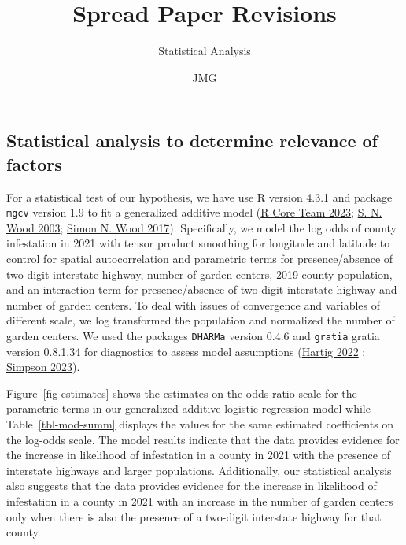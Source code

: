\documentclass[
  letterpaper,
  DIV=11,
  numbers=noendperiod]{scrartcl}
\title{Spread Paper Revisions}
\subtitle{Statistical Analysis}
\author{JMG}
\date{}
\begin{document}
\maketitle
\ifdefined\Shaded\renewenvironment{Shaded}{\begin{tcolorbox}[sharp corners, interior hidden, borderline west={3pt}{0pt}{shadecolor}, enhanced, boxrule=0pt, frame hidden, breakable]}{\end{tcolorbox}}\fi

\hypertarget{statistical-analysis-to-determine-relevance-of-factors}{%
\subsection{Statistical analysis to determine relevance of
factors}\label{statistical-analysis-to-determine-relevance-of-factors}}

For a statistical test of our hypothesis, we have use R version 4.3.1
and package \texttt{mgcv} version 1.9 to fit a generalized additive
model (\protect\hyperlink{ref-rcore}{R Core Team 2023};
\protect\hyperlink{ref-wood2003}{S. N. Wood 2003};
\protect\hyperlink{ref-wood2017generalized}{Simon N. Wood 2017}).
Specifically, we model the log odds of county infestation in 2021 with
tensor product smoothing for longitude and latitude to control for
spatial autocorrelation and parametric terms for presence/absence of
two-digit interstate highway, number of garden centers, 2019 county
population, and an interaction term for presence/absence of two-digit
interstate highway and number of garden centers. To deal with issues of
convergence and variables of different scale, we log transformed the
population and normalized the number of garden centers. We used the
packages \texttt{DHARMa} version 0.4.6 and \texttt{gratia} gratia
version 0.8.1.34 for diagnostics to assess model assumptions
(\protect\hyperlink{ref-dharma2022}{Hartig 2022} ;
\protect\hyperlink{ref-gratia2023}{Simpson 2023}).

Figure~\ref{fig-estimates} shows the estimates on the odds-ratio scale
for the parametric terms in our generalized additive logistic regression
model while Table~\ref{tbl-mod-summ} displays the values for the same
estimated coefficients on the log-odds scale. The model results indicate
that the data provides evidence for the increase in likelihood of
infestation in a county in 2021 with the presence of interstate highways
and larger populations. Additionally, our statistical analysis also
suggests that the data provides evidence for the increase in likelihood
of infestation in a county in 2021 with an increase in the number of
garden centers only when there is also the presence of a two-digit
interstate highway for that county.
\end{document}
